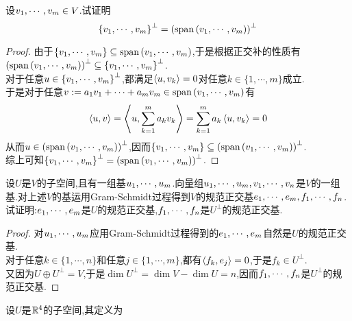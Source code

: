 \documentclass{ctexart}
\begin{document}
\pagestyle{empty}
\begin{center}
    \large{}
\end{center}
\begin{problem}[1.]
    设${v}_1,\cdots,{v}_{m}\in V$.试证明
    \[\left\{{v}_1,\cdots,{v}_{m}\right\}^{\bot}=\left(\text{span}\left({v}_1,\cdots,{v}_{m}\right)\right)^{\bot}\]
\end{problem}
\begin{proof}
    由于$\left\{{v}_1,\cdots,{v}_{m}\right\}\subseteq\text{span}\left({v}_1,\cdots,{v}_{m}\right)$,于是根据正交补的性质有$\left(\text{span}\left({v}_1,\cdots,{v}_{m}\right)\right)^{\bot}\subseteq\left\{{v}_1,\cdots,{v}_{m}\right\}^{\bot}$.\\
    对于任意$u\in\left\{{v}_1,\cdots,{v}_{m}\right\}^\bot$,都满足$\left\langle{u},{v_k}\right\rangle=0$对任意$k\in\{1,\cdots,m\}$成立.\\
    于是对于任意$v:=a_1v_1+\cdots+a_mv_m\in\text{span}\left({v}_1,\cdots,{v}_{m}\right)$有
    \[\left\langle{u},{v}\right\rangle=\left\langle{u},{\sum_{k=1}^{m}a_kv_k}\right\rangle=\sum_{k=1}^{m}a_k\left\langle{u},{v_k}\right\rangle=0\]
    从而$u\in\left(\text{span}\left({v}_1,\cdots,{v}_{m}\right)\right)^{\bot}$,因而$\left\{{v}_1,\cdots,{v}_{m}\right\}\subseteq\left(\text{span}\left({v}_1,\cdots,{v}_{m}\right)\right)^{\bot}$.\\
    综上可知$\left\{{v}_1,\cdots,{v}_{m}\right\}^{\bot}=\left(\text{span}\left({v}_1,\cdots,{v}_{m}\right)\right)^{\bot}$.
\end{proof}
\begin{problem}[2.]
    设$U$是$V$的子空间,且有一组基${u}_1,\cdots,{u}_{m}$.向量组${u}_1,\cdots,{u}_{m},{v}_1,\cdots,{v}_{n}$是$V$的一组基.对上述$V$的基运用Gram-Schmidt过程得到$V$的规范正交基${e}_1,\cdots,{e}_{m},{f}_1,\cdots,{f}_{n}$.试证明:${e}_1,\cdots,{e}_{m}$是$U$的规范正交基,${f}_1,\cdots,{f}_{n}$是$U^\bot$的规范正交基.
\end{problem}
\begin{proof}
    对${u}_1,\cdots,{u}_{m}$应用Gram-Schmidt过程得到的${e}_1,\cdots,{e}_{m}$自然是$U$的规范正交基.\\
    对于任意$k\in\{1,\cdots,n\}$和任意$j\in\{1,\cdots,m\}$,都有$\left\langle{f_k},{e_j}\right\rangle=0$,于是$f_k\in U^\bot$.\\
    又因为$U\oplus U^\bot=V$,于是$\dim U^\bot=\dim V-\dim U=n$,因而${f}_1,\cdots,{f}_{n}$是$U^\bot$的规范正交基.
\end{proof}
\begin{problem}[3.]
    设$U$是$\mathbb{R}^4$的子空间,其定义为
\end{problem}
\end{document}
